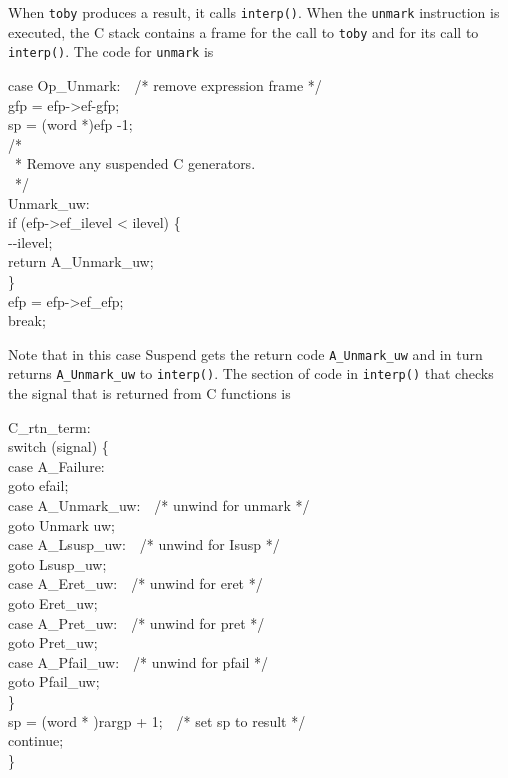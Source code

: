 When \texttt{toby} produces a result, it calls \texttt{interp()}. When
the \texttt{unmark} instruction is executed, the C stack contains a
frame for the call to \texttt{toby} and for its call to
\texttt{interp()}. The code for \texttt{unmark} is

\begin{iconcode}
\>case Op\_Unmark:\ \ /* remove expression frame */\\
\>\>gfp = efp->ef-gfp;\\
\>\>sp = (word *)efp -1;\\
\>\>/*\\
\>\>\ * Remove any suspended C generators.\\
\>\>\ */\\
\>Unmark\_uw:\\
\>\>if (efp->ef\_ilevel < ilevel) \{\\
\>\>\>{}-{}-ilevel;\\
\>\>\>return A\_Unmark\_uw;\\
\>\>\>\}\\
\>\>efp = efp->ef\_efp;\\
\>\>break;
\end{iconcode}


Note that in this case Suspend gets the return code
\texttt{A\_Unmark\_uw} and in turn returns \texttt{A\_Unmark\_uw} to
\texttt{interp()}. The section of code in \texttt{interp()} that
checks the signal that is returned from C functions is

\begin{iconcode}
\>C\_rtn\_term:\\
\>\>switch (signal) \{\\
\>\>case A\_Failure:\\
\>\>\>goto efail;\\
\>\>case A\_Unmark\_uw:\ \ \>\>\>\>\>\>\>\>/* unwind for unmark */\\
\>\>\>goto Unmark uw;\\
\>\>case A\_Lsusp\_uw:\ \ \>\>\>\>\>\>\>\>/* unwind for Isusp */\\
\>\>\>goto Lsusp\_uw;\\
\>\>case A\_Eret\_uw:\ \ \>\>\>\>\>\>\>\>/* unwind for eret */\\
\>\>\>goto Eret\_uw;\\
\>\>case A\_Pret\_uw:\ \ \>\>\>\>\>\>\>\>/* unwind for pret */\\
\>\>\>goto Pret\_uw;\\
\>\>case A\_Pfail\_uw:\ \ \>\>\>\>\>\>\>\>/* unwind for pfail */\\
\>\>\>goto Pfail\_uw;\\
\>\>\}\\
\>\>sp = (word * )rargp + 1;\ \ \>\>\>\>\>\>\>\>/* set sp to result */\\
\>\>continue;\\
\>\}
\end{iconcode}


